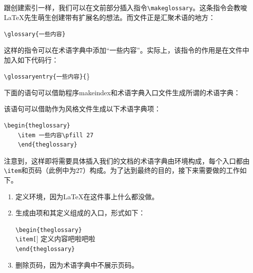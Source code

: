 跟创建索引一样，我们可以在文前部分插入指令\verb|\makeglossary|。这条指令会教唆\LaTeX 先生萌生创建带有扩展名的想法。而文件正是汇聚术语的地方：

\begin{dmd}
\verb|\glossary{一些内容}|
\end{dmd}

这样的指令可以在术语字典中添加“一些内容”。实际上，该指令的作用是在文件中加入如下代码行：

\begin{dmd}
\verb+\glossaryentry{一些内容}{+\}
\end{dmd}

下面的语句可以借助程序\textsf{makeindex}和术语字典入口文件生成所谓的术语字典：


该语句可以借助作为风格文件生成以下术语字典项：

\begin{dmd}
\begin{verbatim}
\begin{theglossary}
    \item 一些内容\pfill 27
    \end{theglossary}\end{verbatim}
\end{dmd}

注意到，这样即将需要具体插入我们的文档的术语字典由环境构成，每个入口都由\verb|\item|和页码（此例中为27）构成。为了达到最终的目的，接下来需要做的工作如下。

\begin{enumerate}
    \item 定义环境，因为\LaTeX 在这件事上什么都没做。
    \item 生成由项和其定义组成的入口，形式如下：
    
    \begin{dmd}
    \verb|\begin{theglossary}|\\
    \verb|\item[|] 定义内容吧啦吧啦\\
    \verb+\end{theglossary}+
    \end{dmd}
    \item 删除页码，因为术语字典中不展示页码。
\end{enumerate}

